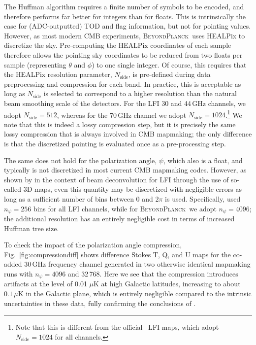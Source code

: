 \documentclass[twocolumn]{aa}
\newcommand{\BP}{\textsc{BeyondPlanck}}
\begin{document}
The Huffman algorithm requires a finite number of symbols to be
encoded, and therefore performs far better for integers than for
floats. This is intrinsically the case for (ADC-outputted) TOD and
flag information, but not for pointing values. However, as most modern
CMB experiments, \BP\ uses HEALPix to discretize the
sky. Pre-computing the HEALPix coordinates of each sample therefore
allows the pointing sky coordinates to be reduced from two floats per
sample (representing $\theta$ and $\phi$) to one single integer. Of
course, this requires that the HEALPix resolution parameter,
$N_{\mathrm{side}}$, is pre-defined during data preprocessing and
compression for each band. In practice, this is acceptable as long as
$N_{\mathrm{side}}$ is selected to correspond to a higher resolution
than the natural beam smoothing scale of the detectors. For the LFI 30
and 44\,GHz channels, we adopt $N_{\mathrm{side}}=512$, whereas for
the 70\,GHz channel we adopt $N_{\mathrm{side}}=1024$.\footnote{Note
  that this is different from the official \Planck\ LFI maps, which
  adopt $N_{\mathrm{side}}=1024$ for all channels.} We note that this
is indeed a lossy compression step, but it is precisely the same lossy
compression that is always involved in CMB mapmaking; the only
difference is that the discretized pointing is evaluated once as a
pre-processing step.


The same does not hold for the polarization angle, $\psi$, which also
is a float, and typically is not discretized in most current CMB
mapmaking codes. However, as shown by \citet{keihanen2012} in the
context of beam deconvolution for LFI through the use of so-called 3D
maps, even this quantity may be discretized with negligible errors as
long as a sufficient number of bins between 0 and $2\pi$ is
used. Specifically, \citet{keihanen2012} used $n_{\psi}=256$ bins for
all LFI channels, while for \BP\ we adopt $n_{\psi}=4096$; the
additional resolution has an entirely negligible cost in terms of
increased Huffman tree size.

To check the impact of the polarization angle compression,
Fig.~\ref{fig:compressiondiff} shows difference Stokes T, Q, and U
maps for the co-added 30\,GHz frequency channel generated in two
otherwise identical mapmaking runs with $n_{\psi}=4096$ and
32\,768. Here we see that the compression introduces artifacts at the
level of 0.01 $\mu$K at high Galactic latitudes, increasing to about
$0.1\,\mu$K in the Galactic plane, which is entirely negligible
compared to the intrinsic uncertainties in these data, fully
confirming the conclusions of \citet{keihanen2012}.
\end{document}
